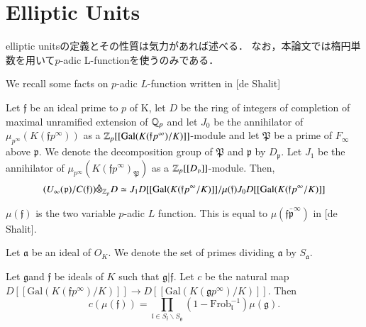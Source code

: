 \documentclass{ujarticle}
\newcommand\p{\mathfrak{p}}
\newcommand\f{\mathfrak{f}}
\newcommand\G{\mathrm{Gal}}
\newcommand\iy{\infty}
\newcommand\mf{\mathfrak}
\begin{document}
\section{Elliptic Units}
\label{sec:Elliptic Units}
elliptic unitsの定義とその性質は気力があれば述べる．
なお，本論文では楕円単数を用いて$p$-adic L-functionを使うのみである．




We recall some facts on $p$-adic $L$-function written in [de Shalit]
\begin{prop}
Let $\f$ be an ideal prime to $p$ of K, let $D$ be the ring of  integers of completion of maximal unramified extension of $\mathbb{Q}_p$ and let $J_0$ be the annihilator of $\mu_{p^{\iy}}(K(\f p^{\iy}))$ as a $\Z_p[[\G(K(\f p^{\iy})/K)]]$-module
and let $\mathfrak{P}$ be a prime of $F_{\iy}$ above $\p$.
We denote   the decomposition group of $\mathfrak{P}$ and $\p$  by $D_{\p}$.
Let $J_1$ be the annihilator of $\mu_{p^{\iy}}(K(\f p^{\iy})_{\mathfrak{P}})$  as a $\Z_p[[D_{\p}]]$-module.
Then,
\begin{equation*}
(U_{\infty}(\p)/C({\f}))\hat{\otimes}_{\Z_p} D \simeq J_1 D[[\G(K(\f p^{\iy}/K)]]/\mu(\f)J_0D[[\G(K(\f p^{\iy}/K)]]
\end{equation*}
\end{prop}

\begin{rem}
$\mu(\f)$ is the two variable $p$-adic $L$ function.
This is equal to $\mu(\f\bar{\p}^{\iy})$ in [de Shalit].
\end{rem}

Let $\mf{a}$ be an ideal   of $O_K$. We denote  the set of primes dividing $\mathfrak{a}$ by  $S_{\mathfrak{a}}$.
\begin{prop}
Let  $\mathfrak{g} $and $ \f$ be ideals of $K$ such that $\mf{g}|\mf{f}$.
Let $c$ be the natural  map $D[[\G(K(\f p^{\iy})/K)]] \to D[[\G(K(\mathfrak{g} p^{\iy})/K)]]$.
Then
\begin{equation*}
c(\mu(\f))=\prod\limits_{\mathfrak{l} \in S_{\mathfrak{f}}\backslash S_{\mathfrak{g}}} (1-\mathrm{Frob}_{\mathfrak{l}}^{-1})\mu(\mathfrak{g}).
\end{equation*}
\end{prop}
\end{document}
